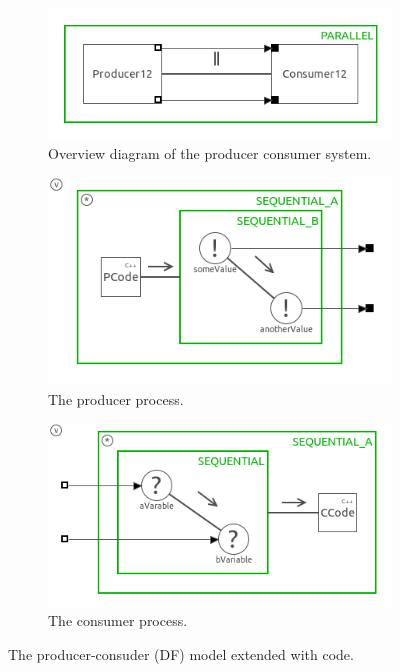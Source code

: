 \documentclass[a4paper,twoside,11pt]{article}
\begin{document}
\begin{figure}
 \centering
 \begin{subfigure}{\textwidth}
  \centering
  \includegraphics[scale=0.8]{./images/1_2-SystemDF+_main.png}
  \caption{Overview diagram of the producer consumer system.}
 \end{subfigure}
 \begin{subfigure}{0.5\textwidth}
  \centering
	\includegraphics[width=\textwidth]{./images/1_2-SystemDF+_prod.png}
	\caption{The producer process.}
 \end{subfigure}%
 \begin{subfigure}{0.5\textwidth}
  \centering
	\includegraphics[width=\textwidth]{./images/1_2-SystemDF+_cons.png}
	\caption{The consumer process.}
 \end{subfigure}
 \caption{The producer-consuder (DF) model extended with code.}
 \label{fig:SystemDF+}
\end{figure}
\end{document}
